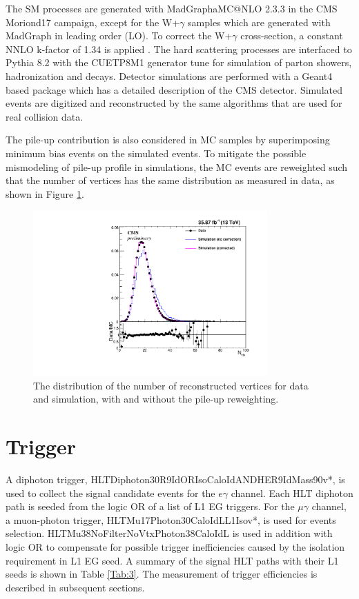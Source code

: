 \documentclass[thesis.tex]{subfiles}
\renewcommand\_{\textunderscore\allowbreak}
\begin{document}
The SM processes are generated with MadGraph\_aMC@NLO 2.3.3 in the CMS Moriond17 campaign, except for the W+$\gamma$ samples which are generated with MadGraph in leading order (LO). 
To correct the W+$\gamma$ cross-section, a constant NNLO k-factor of 1.34 is applied \cite{K:MonoPho, K:Bozzi}. 
The hard scattering processes  are interfaced to Pythia 8.2 with the CUETP8M1 generator tune for simulation of parton showers,  hadronization and decays. 
Detector simulations are performed with a Geant4 based package which has a detailed description of the CMS detector. 
Simulated events are digitized and reconstructed by the same algorithms that are used for real collision data. 

The pile-up contribution is also considered in MC samples by superimposing minimum bias events on the simulated events. 
To mitigate the possible mismodeling of pile-up profile in simulations, the MC events are reweighted such that the number of vertices has the same distribution as measured in data, as shown in Figure \ref{fig:PUreweight}.

\begin{figure}[tb]
  \centering
    \includegraphics[width=0.8\textwidth]{Figures/PLOT_PUreweight.pdf}
  \caption{The distribution of the number of reconstructed vertices for data and simulation, with and without the pile-up reweighting.}
  \label{fig:PUreweight}
\end{figure}


\section{Trigger}
\label{sec:trigger}
A diphoton trigger, HLT\_Diphoton30\_18\_R9Id\_OR\_IsoCaloId\_AND\_HE\_R9Id\_Mass90\_v*, is used to collect the signal candidate events for the $e\gamma$ channel. Each HLT diphoton path is seeded from the logic OR of a list of L1 EG triggers.
For the $\mu\gamma$ channel, a muon-photon trigger, HLT\_Mu17\_Photon30\_CaloIdL\_L1Iso\_v*, is used for events selection. 
HLT\_Mu38NoFilterNoVtx\_Photon38\_CaloIdL is used in addition with logic OR to compensate for possible trigger inefficiencies caused by the isolation requirement in L1 EG seed. 
A summary of the signal HLT paths with their L1 seeds is shown in Table \ref{Tab:3}. 
The measurement of trigger efficiencies is described in subsequent sections.
\end{document}
